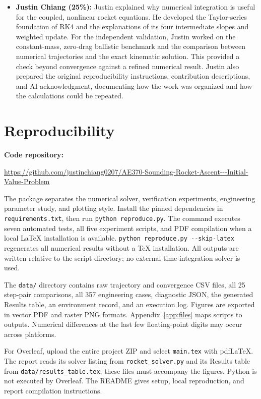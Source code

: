 \documentclass{article}
\newcommand{\repositoryurl}{https://github.com/justinchiang0207/AE370-Sounding-Rocket-Ascent---Initial-Value-Problem}
\newcommand{\repositorylink}{\expandafter\url\expandafter{\repositoryurl}}
\begin{document}
\begin{itemize}
\item \textbf{Justin Chiang (25\%):} Justin explained why numerical integration is useful for the coupled, nonlinear rocket equations. He developed the Taylor-series foundation of RK4 and the explanations of its four intermediate slopes and weighted update. For the independent validation, Justin worked on the constant-mass, zero-drag ballistic benchmark and the comparison between numerical trajectories and the exact kinematic solution. This provided a check beyond convergence against a refined numerical result. Justin also prepared the original reproducibility instructions, contribution descriptions, and AI acknowledgment, documenting how the work was organized and how the calculations could be repeated.
\end{itemize}

\section{Reproducibility}
\textbf{Code repository:}\par
\noindent\repositorylink\par
\vspace{\baselineskip}

The package separates the numerical solver, verification experiments, engineering parameter study, and plotting style. Install the pinned dependencies in \texttt{requirements.txt}, then run \texttt{python reproduce.py}. The command executes seven automated tests, all five experiment scripts, and PDF compilation when a local LaTeX installation is available. \lstinline[basicstyle=\ttfamily\normalsize]|python reproduce.py --skip-latex| regenerates all numerical results without a TeX installation. All outputs are written relative to the script directory; no external time-integration solver is used.

The \texttt{data/} directory contains raw trajectory and convergence CSV files, all 25 step-pair comparisons, all 357 engineering cases, diagnostic JSON, the generated Results table, an environment record, and an execution log. Figures are exported in vector PDF and raster PNG formats. Appendix~\ref{app:files} maps scripts to outputs. Numerical differences at the last few floating-point digits may occur across platforms.

For Overleaf, upload the entire project ZIP and select \texttt{main.tex} with pdfLaTeX. The report reads its solver listing from \texttt{rocket\_solver.py} and its Results table from \texttt{data/results\_table.tex}; these files must accompany the figures. Python is not executed by Overleaf. The README gives setup, local reproduction, and report compilation instructions.
\end{document}
